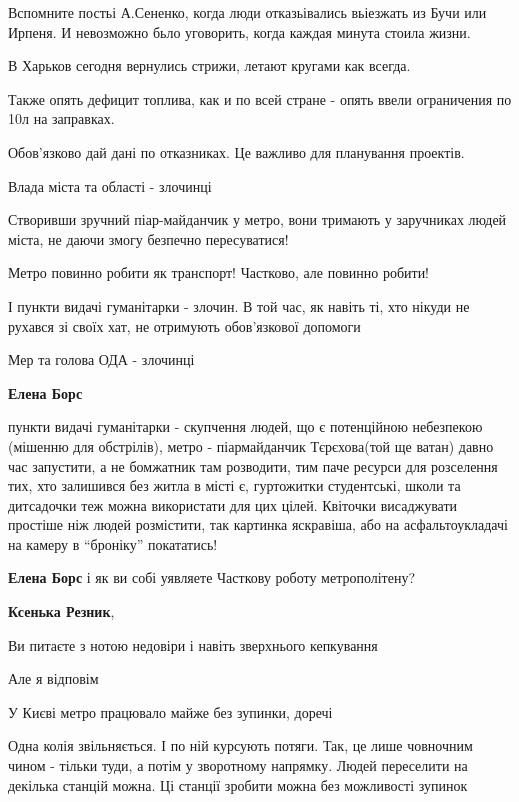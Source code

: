 \begin{itemize}

Вспомните постьі А.Сененко, когда люди отказьівались вьіезжать из Бучи или
Ирпеня. И невозможно бьло уговорить, когда каждая минута стоила жизни.


В Харьков сегодня вернулись стрижи, летают кругами как всегда.

Также опять дефицит топлива, как и по всей стране - опять ввели ограничения по
10л на заправках.


Обов'язково дай дані по отказниках. Це важливо для планування проектів.


Влада міста та області - злочинці

Створивши зручний піар-майданчик у метро, вони тримають у заручниках людей
міста, не даючи змогу безпечно пересуватися!

Метро повинно робити як транспорт! Частково, але повинно робити!

І пункти видачі гуманітарки - злочин. В той час, як навіть ті, хто нікуди не
рухався зі своїх хат, не отримують обов'язкової допомоги

Мер та голова ОДА - злочинці

\begin{itemize} %
\textbf{Елена Борс} 

пункти видачі гуманітарки - скупчення людей, що є потенційною небезпекою
(мішенню для обстрілів), метро - піармайданчик Тєрєхова(той ще ватан) давно час
запустити, а не бомжатник там розводити, тим паче ресурси для розселення тих,
хто залишився без житла в місті є, гуртожитки студентські, школи та дитсадочки
теж можна використати для цих цілей. Квіточки висаджувати простіше ніж людей
розмістити, так картинка яскравіша, або на асфальтоукладачі на камеру в
\enquote{броніку} покататись!

\textbf{Елена Борс} і як ви собі уявляете Часткову роботу метрополітену?

\textbf{Ксенька Резник}, 

Ви питаєте з нотою недовіри і навіть зверхнього кепкування

Але я відповім

У Києві метро працювало майже без зупинки, доречі

Одна колія звільняється. І по ній курсують потяги. Так, це лише човночним чином
- тільки туди, а потім у зворотному напрямку. Людей переселити на декілька
станцій можна. Ці станції зробити можна без можливості зупинок


\end{itemize}
\end{itemize}
